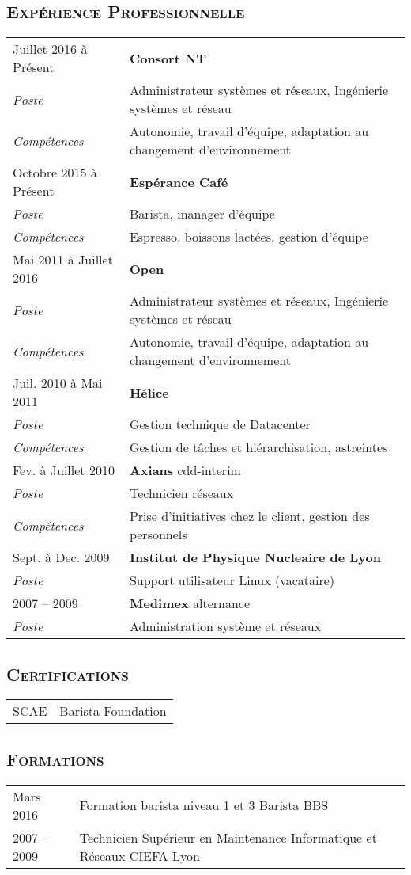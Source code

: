 \documentclass[a4paper]{article}
\newcommand{\hsubsection}[1]{\subsection*{\fontfamily{phv}\selectfont\textsc{#1}}}
\begin{document}
\hsubsection{Expérience Professionnelle}
\begin{tabular}{P{3.5cm}|p{13cm}}
Juillet 2016 à Présent & \textbf{Consort NT}\\
\textsl{Poste}          & Administrateur systèmes et réseaux, Ingénierie systèmes et réseau\\
\textsl{Compétences}            & Autonomie, travail d’équipe, adaptation au changement d’environnement\\
Octobre 2015 à Présent  & \textbf{Espérance Café}\\
\textsl{Poste} & Barista, manager d'équipe\\
\textsl{Compétences}    & Espresso, boissons lactées, gestion d'équipe\\
Mai 2011 à Juillet 2016 & \textbf{Open}\\
\textsl{Poste}          & Administrateur systèmes et réseaux, Ingénierie systèmes et réseau\\
\textsl{Compétences}            & Autonomie, travail d’équipe, adaptation au changement d’environnement\\
Juil. 2010 à Mai 2011   & \textbf{Hélice}\\
\textsl{Poste}          & Gestion technique de Datacenter\\
\textsl{Compétences}    & Gestion de tâches et hiérarchisation, astreintes\\
Fev. à Juillet 2010     & \textbf{Axians} cdd-interim\\
\textsl{Poste}          & Technicien réseaux\\
\textsl{Compétences}    & Prise d’initiatives chez le client, gestion des personnels\\
Sept. à Dec. 2009       & \textbf{Institut de Physique Nucleaire de Lyon}\\
\textsl{Poste}          & Support utilisateur Linux (vacataire)\\
2007 – 2009             & \textbf{Medimex} alternance\\
\textsl{Poste}          & Administration système et réseaux\\
\end{tabular}

\hsubsection{Certifications}
\begin{tabular}{P{3.5cm}|p{13cm}}
SCAE                    & Barista Foundation\\
\end{tabular}

\hsubsection{Formations}
\begin{tabular}{P{3.5cm}|p{13cm}}
Mars 2016               & Formation barista niveau 1 et 3 Barista BBS\\
2007 – 2009             & Technicien Supérieur en Maintenance Informatique et Réseaux CIEFA Lyon\\
\end{tabular}
\end{document}
